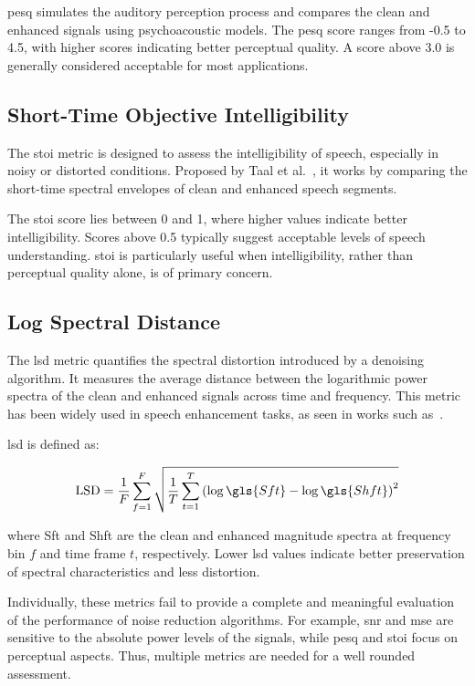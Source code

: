 \gls{pesq} simulates the auditory perception process and compares the clean and enhanced signals using psychoacoustic models. The \gls{pesq} score ranges from -0.5 to 4.5, with higher scores indicating better perceptual quality. A score above 3.0 is generally considered acceptable for most applications.

\subsection{Short-Time Objective Intelligibility}
\label{subsec:stoi}

The \gls{stoi} metric is designed to assess the intelligibility of speech, especially in noisy or distorted conditions. Proposed by Taal et al.~\cite{taal2011stoi}, it works by comparing the short-time spectral envelopes of clean and enhanced speech segments.

The \gls{stoi} score lies between 0 and 1, where higher values indicate better intelligibility. Scores above 0.5 typically suggest acceptable levels of speech understanding. \gls{stoi} is particularly useful when intelligibility, rather than perceptual quality alone, is of primary concern.

\subsection{Log Spectral Distance}
\label{subsec:lsd}

The \gls{lsd} metric quantifies the spectral distortion introduced by a denoising algorithm. It measures the average distance between the logarithmic power spectra of the clean and enhanced signals across time and frequency. This metric has been widely used in speech enhancement tasks, as seen in works such as~\cite{kubichek1993lsd}.

\gls{lsd} is defined as:

\begin{equation}
    \text{LSD} = \frac{1}{F} \sum_{f=1}^{F} \sqrt{ \frac{1}{T} \sum_{t=1}^{T} \left( \log \gls{Sft} - \log \gls{Shft} \right)^2 }
\end{equation}

where \gls{Sft} and \gls{Shft} are the clean and enhanced magnitude spectra at frequency bin \( f \) and time frame \( t \), respectively. Lower \gls{lsd} values indicate better preservation of spectral characteristics and less distortion.

\vspace{2em}
Individually, these metrics fail to provide a complete and meaningful evaluation of the performance of noise reduction algorithms. For example, \gls{snr} and \gls{mse} are sensitive to the absolute power levels of the signals, while \gls{pesq} and \gls{stoi} focus on perceptual aspects. Thus, multiple metrics are needed for a well rounded assessment.


